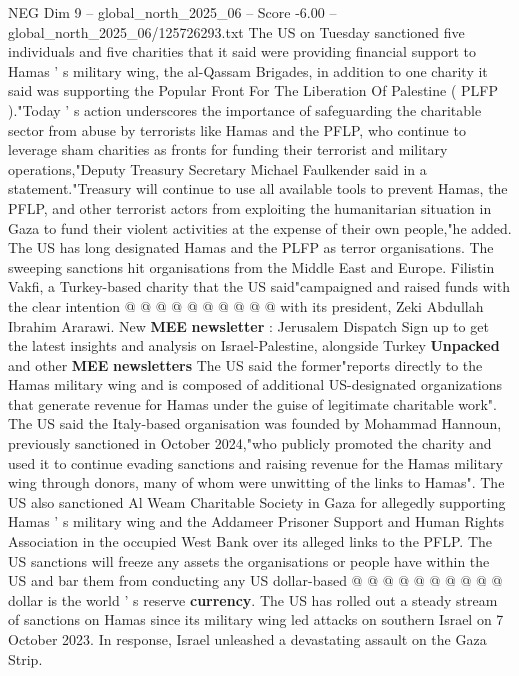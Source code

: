 \begin{textsample}{NEG Dim 9 – global\_north\_2025\_06 – Score -6.00 – global\_north\_2025\_06/125726293.txt}  \label{ex:f9_neg_081}
The US on Tuesday sanctioned five individuals and five charities that it said were providing financial support to Hamas ' s military wing, the al-Qassam Brigades, in addition to one charity it said was supporting the Popular Front For The Liberation Of Palestine ( PLFP )."Today ' s action underscores the importance of safeguarding the charitable sector from abuse by terrorists like Hamas and the PFLP, who continue to leverage sham charities as fronts for funding their terrorist and military operations,"Deputy Treasury Secretary Michael Faulkender said in a statement."Treasury will continue to use all available tools to prevent Hamas, the PFLP, and other terrorist actors from exploiting the humanitarian situation in Gaza to fund their violent activities at the expense of their own people,"he added.
The US has long designated Hamas and the PLFP as terror organisations.
The sweeping sanctions hit organisations from the Middle East and Europe.
Filistin Vakfi, a Turkey-based charity that the US said"campaigned and raised funds with the clear intention @ @ @ @ @ @ @ @ @ @ with its president, Zeki Abdullah Ibrahim Ararawi.
New \textbf{MEE} \textbf{newsletter} : Jerusalem Dispatch Sign up to get the latest insights and analysis on Israel-Palestine, alongside Turkey \textbf{Unpacked} and other \textbf{MEE} \textbf{newsletters} The US said the former"reports directly to the Hamas military wing and is composed of additional US-designated organizations that generate revenue for Hamas under the guise of legitimate charitable work".
The US said the Italy-based organisation was founded by Mohammad Hannoun, previously sanctioned in October 2024,"who publicly promoted the charity and used it to continue evading sanctions and raising revenue for the Hamas military wing through donors, many of whom were unwitting of the links to Hamas".
The US also sanctioned Al Weam Charitable Society in Gaza for allegedly supporting Hamas ' s military wing and the Addameer Prisoner Support and Human Rights Association in the occupied West Bank over its alleged links to the PFLP.
The US sanctions will freeze any assets the organisations or people have within the US and bar them from conducting any US dollar-based @ @ @ @ @ @ @ @ @ @ dollar is the world ' s reserve \textbf{currency}.
The US has rolled out a steady stream of sanctions on Hamas since its military wing led attacks on southern Israel on 7 October 2023.
In response, Israel unleashed a devastating assault on the Gaza Strip.

\end{textsample}
